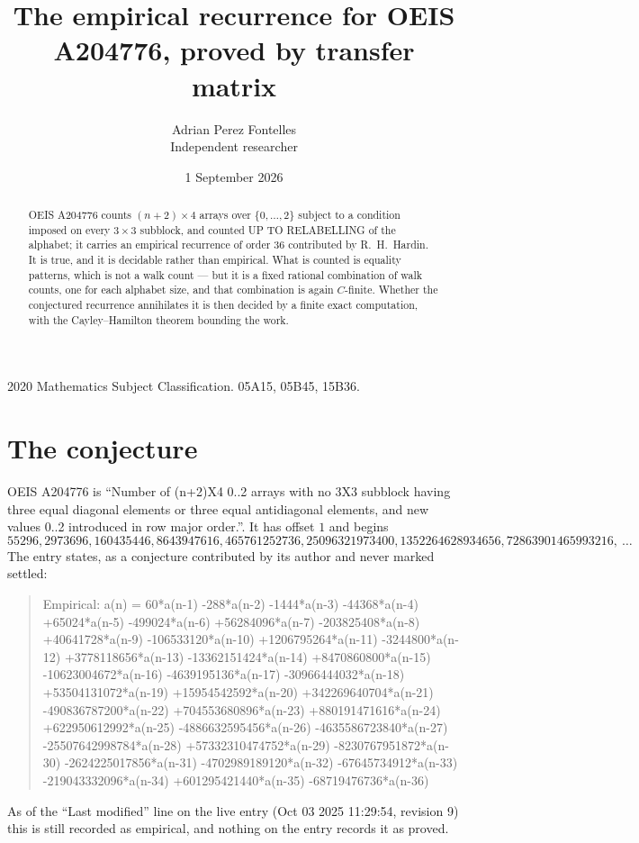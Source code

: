 \documentclass[11pt,a4paper]{article}
\title{The empirical recurrence for OEIS A204776, proved by transfer matrix}
\author{Adrian Perez Fontelles\\ \small Independent researcher}
\date{1 September 2026}
\theoremstyle{plain}
\theoremstyle{definition}
\begin{document}
\maketitle

\begin{abstract}
OEIS A204776 counts $(n+2)\times4$ arrays over $\{0,\dots,2\}$ subject to a condition imposed on
every $3\times3$ subblock, and counted UP TO RELABELLING of the
alphabet; it carries an empirical recurrence of order $36$ contributed by
R.~H.~Hardin. It is true, and it is decidable rather than empirical. What is counted is
equality patterns, which is not a walk count --- but it is a fixed rational combination of
walk counts, one for each alphabet size, and that combination is again $C$-finite. Whether the
conjectured recurrence annihilates it is then decided by a finite exact computation, with the
Cayley--Hamilton theorem bounding the work.
\end{abstract}

\noindent\small 2020 Mathematics Subject Classification. 05A15, 05B45, 15B36.\normalsize

\section{The conjecture}

OEIS A204776 is ``Number of (n+2)X4 0..2 arrays with no 3X3 subblock having three equal diagonal elements or three equal antidiagonal elements, and new values 0..2 introduced in row major order.''. It has offset $1$ and begins
\[
55296, 2973696, 160435446, 8643947616, 465761252736, 25096321973400, 1352264628934656, 72863901465993216,\ \dots
\]
The entry states, as a conjecture contributed by its author and never marked settled:
\begin{quote}
Empirical: a(n) = 60*a(n-1) -288*a(n-2) -1444*a(n-3) -44368*a(n-4) +65024*a(n-5) -499024*a(n-6) +56284096*a(n-7) -203825408*a(n-8) +40641728*a(n-9) -106533120*a(n-10) +1206795264*a(n-11) -3244800*a(n-12) +3778118656*a(n-13) -13362151424*a(n-14) +8470860800*a(n-15) -10623004672*a(n-16) -4639195136*a(n-17) -30966444032*a(n-18) +53504131072*a(n-19) +15954542592*a(n-20) +342269640704*a(n-21) -490836787200*a(n-22) +704553680896*a(n-23) +880191471616*a(n-24) +622950612992*a(n-25) -4886632595456*a(n-26) -4635586723840*a(n-27) -25507642998784*a(n-28) +57332310474752*a(n-29) -8230767951872*a(n-30) -2624225017856*a(n-31) -4702989189120*a(n-32) -67645734912*a(n-33) -219043332096*a(n-34) +601295421440*a(n-35) -68719476736*a(n-36)
\end{quote}
As of the ``Last modified'' line on the live entry (Oct 03 2025 11:29:54, revision 9) this is still
recorded as empirical, and nothing on the entry records it as proved.
\end{document}
